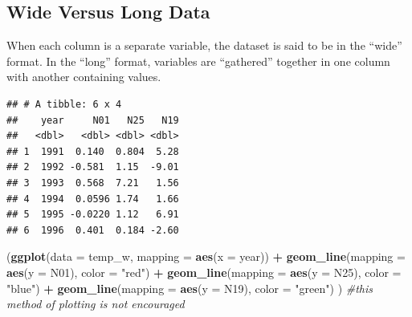 \documentclass[]{article}
\newenvironment{Shaded}{\begin{snugshade}}{\end{snugshade}}
\newcommand{\KeywordTok}[1]{\textcolor[rgb]{0.13,0.29,0.53}{\textbf{#1}}}
\newcommand{\DataTypeTok}[1]{\textcolor[rgb]{0.13,0.29,0.53}{#1}}
\newcommand{\DecValTok}[1]{\textcolor[rgb]{0.00,0.00,0.81}{#1}}
\newcommand{\StringTok}[1]{\textcolor[rgb]{0.31,0.60,0.02}{#1}}
\newcommand{\CommentTok}[1]{\textcolor[rgb]{0.56,0.35,0.01}{\textit{#1}}}
\newcommand{\OperatorTok}[1]{\textcolor[rgb]{0.81,0.36,0.00}{\textbf{#1}}}
\newcommand{\NormalTok}[1]{#1}
\begin{document}
\subsection{Wide Versus Long Data}\label{wide-versus-long-data}

When each column is a separate variable, the dataset is said to be in
the ``wide'' format. In the ``long'' format, variables are ``gathered''
together in one column with another containing values.

\begin{Shaded}
\end{Shaded}

\begin{verbatim}
## # A tibble: 6 x 4
##    year     N01   N25   N19
##   <dbl>   <dbl> <dbl> <dbl>
## 1  1991  0.140  0.804  5.28
## 2  1992 -0.581  1.15  -9.01
## 3  1993  0.568  7.21   1.56
## 4  1994  0.0596 1.74   1.66
## 5  1995 -0.0220 1.12   6.91
## 6  1996  0.401  0.184 -2.60
\end{verbatim}

\begin{Shaded}
\begin{Highlighting}[]
\NormalTok{(}\KeywordTok{ggplot}\NormalTok{(}\DataTypeTok{data =}\NormalTok{ temp_w,}
        \DataTypeTok{mapping =} \KeywordTok{aes}\NormalTok{(}\DataTypeTok{x =}\NormalTok{ year)) }\OperatorTok{+}\StringTok{ }
\StringTok{    }\KeywordTok{geom_line}\NormalTok{(}\DataTypeTok{mapping =} \KeywordTok{aes}\NormalTok{(}\DataTypeTok{y =}\NormalTok{ N01), }\DataTypeTok{color =} \StringTok{"red"}\NormalTok{) }\OperatorTok{+}
\StringTok{    }\KeywordTok{geom_line}\NormalTok{(}\DataTypeTok{mapping =} \KeywordTok{aes}\NormalTok{(}\DataTypeTok{y =}\NormalTok{ N25), }\DataTypeTok{color =} \StringTok{"blue"}\NormalTok{) }\OperatorTok{+}
\StringTok{    }\KeywordTok{geom_line}\NormalTok{(}\DataTypeTok{mapping =} \KeywordTok{aes}\NormalTok{(}\DataTypeTok{y =}\NormalTok{ N19), }\DataTypeTok{color =} \StringTok{"green"}\NormalTok{)}
\NormalTok{  ) }\CommentTok{#this method of plotting is not encouraged}
\end{Highlighting}
\end{Shaded}
\end{document}
